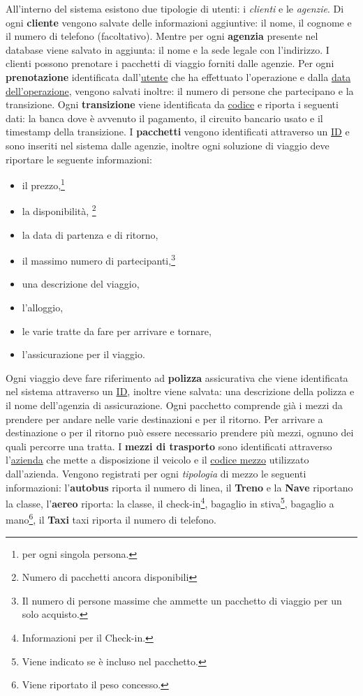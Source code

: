 %
%
All'interno del sistema esistono due tipologie di utenti: i \emph{clienti} e le \emph{agenzie}. Di ogni \textbf{cliente} vengono salvate delle informazioni aggiuntive: il nome, il cognome e il numero di telefono (facoltativo). Mentre per ogni \textbf{agenzia} presente nel database viene salvato in aggiunta: il nome e la sede legale con l'indirizzo.
%
%
I clienti possono prenotare i pacchetti di viaggio forniti dalle agenzie. Per ogni \textbf{prenotazione} identificata dall'\underline{utente} che ha effettuato l'operazione e dalla \underline{data dell'operazione}, vengono salvati inoltre: il numero di persone che partecipano e la transizione.
%
%
Ogni \textbf{transizione} viene identificata da \underline{codice} e riporta i seguenti dati: la banca dove è avvenuto il pagamento, il circuito bancario usato e il timestamp della transizione.
%
%
I \textbf{pacchetti} vengono identificati attraverso un \underline{ID} e sono inseriti nel sistema dalle agenzie, inoltre ogni soluzione di viaggio deve riportare le seguente informazioni:
\begin{multicols}{2}
\begin{itemize}
    \item il prezzo,\footnote{per ogni singola persona.}
    \item la disponibilità, \footnote{Numero di pacchetti ancora disponibili}
    \item la data di partenza e di ritorno,
    \item il massimo numero di partecipanti,\footnote{Il numero di persone massime che ammette un pacchetto di viaggio per un solo acquisto.}
    \item una descrizione del viaggio,
    \item l'alloggio,
    \item le varie tratte da fare per arrivare e tornare,
    \item l'assicurazione per il viaggio.
\end{itemize}
\end{multicols}
Ogni viaggio deve fare riferimento ad \textbf{polizza} assicurativa che viene identificata nel sistema attraverso un \underline{ID}, inoltre viene salvata: una descrizione della polizza e il nome dell'agenzia di assicurazione.
%
%
Ogni pacchetto comprende già i mezzi da prendere per andare nelle varie destinazioni e per il ritorno. Per arrivare a destinazione o per il ritorno può essere necessario prendere più mezzi, ognuno dei quali percorre una tratta. I \textbf{mezzi di trasporto} sono identificati attraverso l'\underline{azienda} che mette a disposizione il veicolo e il \underline{codice mezzo} utilizzato dall'azienda. Vengono registrati per ogni \emph{tipologia} di mezzo le seguenti informazioni:
l'\textbf{autobus} riporta il numero di linea,
il \textbf{Treno} e la \textbf{Nave} riportano la classe,
l'\textbf{aereo} riporta:
la classe,
il check-in\footnote{Informazioni per il Check-in.},
bagaglio in stiva\footnote{Viene indicato se è incluso nel pacchetto.},
bagaglio a mano\footnote{Viene riportato il peso concesso.},
%
il \textbf{Taxi} taxi riporta il numero di telefono.


